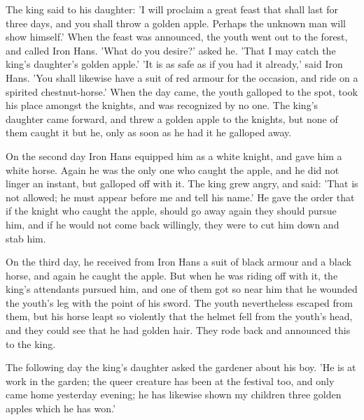\documentclass[12pt]{book}
\begin{document}
The king said to his daughter: 'I will proclaim a great feast that
shall last for three days, and you shall throw a golden apple. Perhaps
the unknown man will show himself.' When the feast was announced, the
youth went out to the forest, and called Iron Hans. 'What do you
desire?' asked he. 'That I may catch the king's daughter's golden
apple.' 'It is as safe as if you had it already,' said Iron Hans. 'You
shall likewise have a suit of red armour for the occasion, and ride on
a spirited chestnut-horse.' When the day came, the youth galloped to
the spot, took his place amongst the knights, and was recognized by no
one. The king's daughter came forward, and threw a golden apple to the
knights, but none of them caught it but he, only as soon as he had it
he galloped away.

On the second day Iron Hans equipped him as a white knight, and gave
him a white horse. Again he was the only one who caught the apple, and
he did not linger an instant, but galloped off with it. The king grew
angry, and said: 'That is not allowed; he must appear before me and
tell his name.' He gave the order that if the knight who caught the
apple, should go away again they should pursue him, and if he would
not come back willingly, they were to cut him down and stab him.

On the third day, he received from Iron Hans a suit of black armour
and a black horse, and again he caught the apple. But when he was
riding off with it, the king's attendants pursued him, and one of them
got so near him that he wounded the youth's leg with the point of his
sword. The youth nevertheless escaped from them, but his horse leapt
so violently that the helmet fell from the youth's head, and they
could see that he had golden hair. They rode back and announced this
to the king.

The following day the king's daughter asked the gardener about his
boy. 'He is at work in the garden; the queer creature has been at the
festival too, and only came home yesterday evening; he has likewise
shown my children three golden apples which he has won.'
\end{document}
